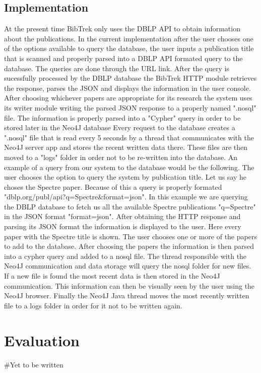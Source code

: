 \documentclass{article}
\begin{document}
\subsection{Implementation}
At the present time BibTrek only uses the DBLP API to obtain information about the publications. In the current implementation after the user chooses one of the options available to query the database, the user inputs a publication title that is scanned and properly parsed into a DBLP API formated query to the database. The queries are done through the URL link. After the query is sucessfully processed by the DBLP database the BibTrek HTTP module retrieves the response, parses the JSON and displays the information in the user console. After choosing whichever papers are appropriate for its research the system uses its writer module writing the parsed JSON response to a properly named ".nosql" file. The information is properly parsed into a "Cypher" query in order to be stored later in the Neo4J database Every request to the database creates a ".nosql" file that is read every 5 seconds by a thread that communicates with the Neo4J server app and stores the recent written data there. These files are then moved to a "logs" folder in order not to be re-written into the database. An example of a query from our system to the database would be the following. The user chooses the option to query the system by publication title. Let us say he choses the Spectre paper. Because of this a query is properly formated "dblp.org/publ/api?q=Spectre&format=json". In this example we are querying the DBLP database to fetch us all the available Spectre publications "q=Spectre" in the JSON format "format=json". After obtaining the HTTP response and parsing its JSON format the information is displayed to the user. Here every paper with the Spectre title is shown. The user chooses one or more of the papers to add to the database. After choosing the papers the information is then parsed into a cypher query and added to a nosql file. The thread responsible with the Neo4J communication and data storage will query the nosql folder for new files. If a new file is found the most recent data is then stored in the Neo4J communication. This information can then be visually seen by the user using the Neo4J browser. Finally the Neo4J Java thread moves the most recently written file to a logs folder in order for it not to be written again.

\section{Evaluation}
#Yet to be written
\end{document}
